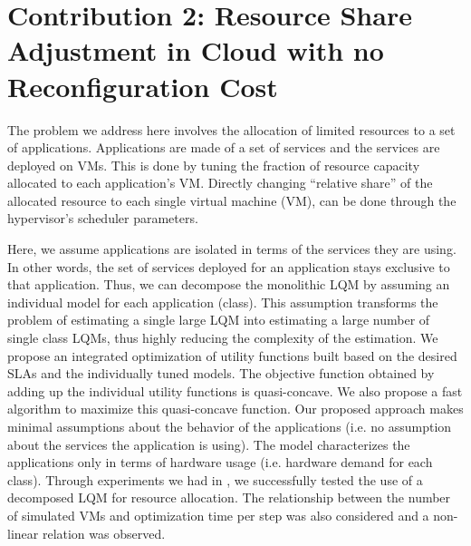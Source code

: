 \documentclass[11pt]{article}
\begin{document}
 \section{Contribution 2: Resource Share Adjustment in Cloud with no Reconfiguration Cost}   
\label{optimization_no_reconfiguration_cost} 

The problem we address here involves the allocation of limited resources to a set of applications. 
Applications are made of a set of services and the services are deployed on VMs. 
This is done by tuning the fraction of resource capacity allocated to each application's VM. Directly changing ``relative share'' of the allocated resource to each single virtual machine (VM), can be done through the hypervisor's scheduler parameters.

Here, we assume applications are isolated in terms of the services they are using. In other words, the set of services deployed for an application stays exclusive to that application. Thus, we can decompose the monolithic LQM by assuming an individual model for each application (class). This assumption transforms the problem of estimating a single large LQM into estimating a large number of single class LQMs, thus highly reducing the complexity of the estimation. 
%
We propose an integrated optimization of utility functions built based on the desired SLAs and the individually tuned models. 
The objective function obtained by adding up the individual utility functions is quasi-concave. 
We also propose a fast algorithm to maximize this quasi-concave function. 
%
Our proposed approach makes minimal assumptions about the behavior of the applications (i.e. no assumption about the services the application is using). The model characterizes the applications only in terms of hardware usage (i.e. hardware demand for each class). %
%
Through experiments we had in \cite{ghanbari_feedback-based_????}, we successfully tested the use of a decomposed LQM for resource allocation. The relationship between the number of simulated VMs and optimization time per step was also considered and a non-linear relation was observed. 
\end{document}
